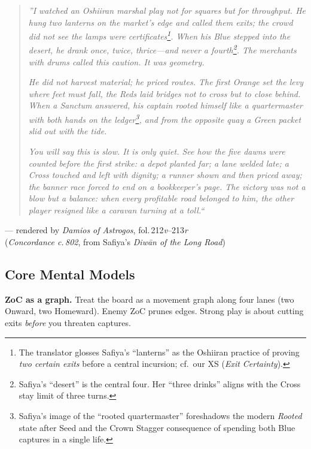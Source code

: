 \documentclass[11pt]{article}
\begin{document}
\vspace{-0.5em}
\begin{quote}\small
\textit{''I watched an Oshiiran marshal play not for squares but for \emph{throughput}. He hung two lanterns on the market's edge and called them exits; the crowd did not see the lamps were \emph{certificates}\footnote{The translator glosses Safiya's ``lanterns'' as the Oshiiran practice of proving \emph{two certain exits} before a central incursion; cf.\ our XS (\emph{Exit Certainty}).}. When his Blue stepped into the desert, he drank once, twice, thrice---and never a fourth\footnote{Safiya's ``desert'' is the central four. Her ``three drinks'' aligns with the Cross stay limit of three turns.}. The merchants with drums called this caution. It was geometry.}

\textit{He did not harvest material; he priced routes. The first Orange set the levy where feet must fall, the Reds laid bridges \emph{not} to cross but to \emph{close} behind. When a Sanctum answered, his captain rooted himself like a quartermaster with both hands on the ledger\footnote{Safiya's image of the ``rooted quartermaster'' foreshadows the modern \emph{Rooted} state after Seed and the Crown Stagger consequence of spending both Blue captures in a single life.}, and from the opposite quay a Green packet slid out with the tide.}

\textit{You will say this is slow. It is only quiet. See how the five dawns were counted before the first strike: a depot planted far; a lane welded late; a Cross touched and left with dignity; a runner shown and then priced away; the banner race forced to end on a bookkeeper's page. The victory was not a blow but a balance: when every profitable road belonged to him, the other player resigned like a caravan turning at a toll.``}
\end{quote}
\begin{flushright}\small
--- rendered by \textit{Damios of Astrogos}, fol.\,212\textit{v}--213\textit{r}\\
(\textit{Concordance c.\,802}, from Safiya's \emph{Diwān of the Long Road})
\end{flushright}

\subsection*{Core Mental Models}
\textbf{ZoC as a graph.} Treat the board as a movement graph along four lanes (two Onward, two Homeward). Enemy ZoC prunes edges. Strong play is about cutting exits \emph{before} you threaten captures.
\end{document}
